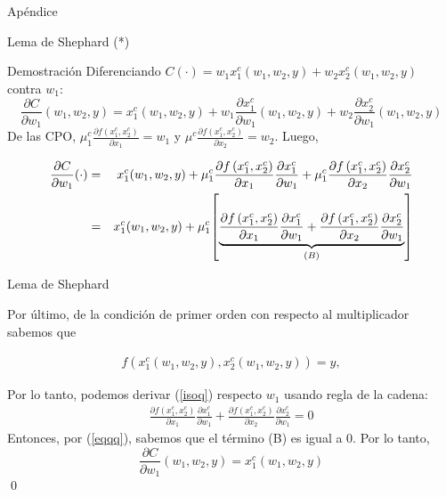 \documentclass{beamer}
\theoremstyle{definition}
\begin{document}
\begin{frame}[noframenumbering]{}
    \begin{center}
        \Large
        Apéndice
    \end{center}
\end{frame}


\begin{frame}[noframenumbering]{Lema de Shephard (*)}
\begin{block}{Demostraci\'on}
Diferenciando $C(\cdot)=w_{1}x_{1}^{c}(w_{1},w_{2},y)+w_{2}x_{2}^{c}(w_{1},w_{2},y)$ contra $w_1$:
\begin{equation*}
\frac{\partial C}{\partial w_{1}}(w_{1},w_{2},y)=x_{1}^{c}(w_{1},w_{2},y)+w_{1}\frac{\partial x_{1}^{c}}{\partial w_{1}}(w_{1},w_{2},y)+w_{2}\frac{\partial x_{2}^{c}}{\partial w_{1}}(w_{1},w_{2},y)
\end{equation*}
De las CPO, $\mu _{1}^{c}\frac{\partial f\left(
x_{1}^{c},x_{2}^{c}\right) }{\partial x_{1}}=w_{1}$ y $\mu ^{c}\frac{\partial
f\left( x_{1}^{c},x_{2}^{c}\right) }{\partial x_{2}}=w_{2}$. Luego,

\begin{eqnarray*}
\frac{\partial C}{\partial w_{1}}(\cdot)
&=&x_{1}^{c}(w_{1},w_{2},y)+\mu _{1}^{c}\frac{\partial f\left(
x_{1}^{c},x_{2}^{c}\right) }{\partial x_{1}}\frac{\partial x_{1}^{c}}{%
\partial w_{1}}+\mu_1^{c}\frac{\partial f\left( x_{1}^{c},x_{2}^{c}\right) }{\partial x_{2}}\frac{\partial x_{2}^{c}}{\partial w_{1}} \\
&=&x_{1}^{c}(w_{1},w_{2},y)+\mu_{1}^{c}{\left[ \underbrace{
\frac{\partial f\left( x_{1}^{c},x_{2}^{c}\right) }{\partial x_{1}}\frac{\partial x_{1}^{c}}{\partial w_{1}}+\frac{\partial f\left(
x_{1}^{c},x_{2}^{c}\right) }{\partial x_{2}}\frac{\partial x_{2}^{c}}{%
\partial w_{1}}}_{(B)}\right] }
\end{eqnarray*}
\end{block}
\end{frame}
\begin{frame}[noframenumbering]{Lema de Shephard }
\begin{block}{}
Por \'ultimo, de la condici\'{o}n de primer orden con respecto al
multiplicador sabemos que

\begin{align}
    f\left(x_{1}^{c}(w_{1},w_{2},y),x_{2}^{c}(w_{1},w_{2},y)\right) =y, \label{isoq}
\end{align}


Por lo tanto, podemos derivar (\ref{isoq}) respecto $w_{1}$ usando regla de la cadena:
\begin{align}
\frac{\partial f\left( x_{1}^{c},x_{2}^{c}\right) }{\partial x_{1}}\frac{\partial x_{1}^{c}}{\partial w_{1}}+\frac{\partial f\left(
x_{1}^{c},x_{2}^{c}\right) }{\partial x_{2}}\frac{\partial x_{2}^{c}}{\partial w_{1}}=0 \label{eqqq}
\end{align}
Entonces, por (\ref{eqqq}), sabemos que el término (B) es igual a 0. Por lo tanto,
\begin{equation*}
\frac{\partial C}{\partial w_{1}}(w_{1},w_{2},y)=x_{1}^{c}(w_{1},w_{2},y)
\end{equation*}
\qed
\end{block}

\end{frame}
\end{document}
